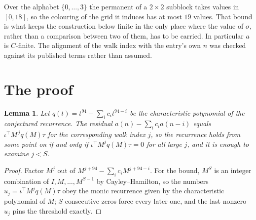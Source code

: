\documentclass[11pt,a4paper]{article}
\theoremstyle{plain}
\newtheorem{lemma}[theorem]{Lemma}
\theoremstyle{definition}
\begin{document}
Over the alphabet $\{0,\dots,3\}$ the permanent of a $2\times2$ subblock takes values in
$[0,18]$, so the colouring of the grid it induces has at most $19$ values.
That bound is what keeps the construction below finite in the only place where the value of
$\sigma$, rather than a comparison between two of them, has to be carried.
In particular $a$ is $C$-finite. The alignment of the walk index with the entry's own $n$ was
checked against its published terms rather than assumed.

\section{The proof}

\begin{lemma}\label{lem:crit}
Let $q(t)=t^{94}-\sum_i c_it^{94-i}$ be the characteristic polynomial of the
conjectured recurrence. The residual $a(n)-\sum_ic_ia(n-i)$ equals
$\iota^{\!\top}M^{\,j}q(M)\tau$ for the corresponding walk index $j$, so the recurrence
holds from some point on if and only if $\iota^{\!\top}M^{j}q(M)\tau=0$ for all large $j$,
and it is enough to examine $j<S$.
\end{lemma}

\begin{proof}
Factor $M^{j}$ out of $M^{j+94}-\sum_ic_iM^{j+94-i}$. For the bound, $M^{S}$
is an integer combination of $I,M,\dots,M^{S-1}$ by Cayley--Hamilton, so the numbers
$u_j=\iota^{\!\top}M^{j}q(M)\tau$ obey the monic recurrence given by the characteristic
polynomial of $M$; $S$ consecutive zeros force every later one, and the last nonzero $u_j$
pins the threshold exactly.
\end{proof}
\end{document}
